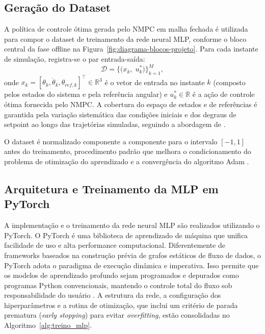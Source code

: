 \subsection{Geração do Dataset}

A política de controle ótima gerada pelo NMPC em malha fechada é utilizada para compor o dataset de treinamento da rede neural MLP, conforme o bloco central da fase offline na Figura~\ref{fig:diagrama-blocos-projeto}. Para cada instante de simulação, registra-se o par entrada-saída:
%
\begin{equation}
    \mathcal{D} = \bigl\{
        \bigl(x_k,\; u_k^*\bigr)
    \bigr\}_{k=1}^{M},
    \label{eq:dataset}
\end{equation}
%
\noindent onde $x_k = [\theta_k, \dot{\theta}_k, \theta_{ref,k}]^\top \in \mathbb{R}^3$ é o vetor de entrada no instante $k$ (composto pelos estados do sistema e pela referência angular) e $u_k^* \in \mathbb{R}$ é a ação de controle ótima fornecida pelo NMPC. A cobertura do espaço de estados e de referências é garantida pela variação sistemática das condições iniciais e dos degraus de setpoint ao longo das trajetórias simuladas, seguindo a abordagem de .

O dataset é normalizado componente a componente para o intervalo $[-1, 1]$ antes do treinamento, procedimento padrão que melhora o condicionamento do problema de otimização do aprendizado e a convergência do algoritmo Adam \cite{karg2020}.



\subsection{Arquitetura e Treinamento da MLP em PyTorch}

A implementação e o treinamento da rede neural MLP são realizados utilizando o PyTorch. O PyTorch é uma biblioteca de aprendizado de máquina que unifica facilidade de uso e alta performance computacional. Diferentemente de frameworks baseados na construção prévia de grafos estáticos de fluxo de dados, o PyTorch adota o paradigma de execução dinâmica e imperativa. Isso permite que os modelos de aprendizado profundo sejam programados e depurados como programas Python convencionais, mantendo o controle total do fluxo sob responsabilidade do usuário \cite{paszke2019}. 
A estrutura da rede, a configuração dos hiperparâmetros e a rotina de otimização, que inclui um critério de parada prematura (\textit{early stopping}) para evitar \textit{overfitting}, estão consolidadas no Algoritmo~\ref{alg:treino_mlp}.

